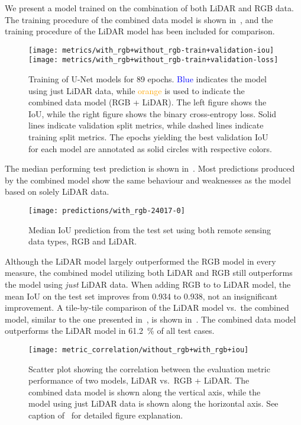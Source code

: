 We present a model trained on the combination of both LiDAR and RGB data.
The training procedure of the combined data model is shown in~, and the training procedure of the LiDAR model has been included for comparison.

\begin{figure}[H]
  \centering
  \texttt{[image: metrics/with\_rgb+without\_rgb-train+validation-iou]}
  \texttt{[image: metrics/with\_rgb+without\_rgb-train+validation-loss]}
  \caption{%
    Training of U-Net models for 89 epochs.
    \textcolor{blue}{Blue} indicates the model using just LiDAR data, while \textcolor{orange}{orange} is used to indicate the combined data model (RGB + LiDAR).
    The left figure shows the IoU, while the right figure shows the binary cross-entropy loss.
    Solid lines indicate validation split metrics, while dashed lines indicate training split metrics.
    The epochs yielding the best validation IoU for each model are annotated as solid circles with respective colors.
  }%
  \label{fig:rgb-lidar-training}
\end{figure}

The median performing test prediction is shown in~.
Most predictions produced by the combined model show the same behaviour and weaknesses as the model based on solely LiDAR data.

\begin{figure}[H]
  \centering
  \texttt{[image: predictions/with\_rgb-24017-0]}  %
  \caption{%
    Median IoU prediction from the test set using both remote sensing data types, RGB and LiDAR.
  }%
  \label{fig:rgb-lidar-median}
\end{figure}

Although the LiDAR model largely outperformed the RGB model in every measure, the combined model utilizing both LiDAR and RGB still outperforms the model using \emph{just} LiDAR data.
When adding RGB to to LiDAR model, the mean IoU on the test set improves from \num{0.934} to \num{0.938}, not an insignificant improvement.
A tile-by-tile comparison of the LiDAR model vs.\ the combined model, similar to the one presented in~, is shown in~.
The combined data model outperforms the LiDAR model in \SI{61.2}{\percent} of all test cases.

\begin{figure}[H]
  \centering
  \texttt{[image: metric\_correlation/without\_rgb+with\_rgb+iou]}
  \caption{%
    Scatter plot showing the correlation between the evaluation metric performance of two models, LiDAR vs.\ RGB + LiDAR\@.
    The combined data model is shown along the vertical axis, while the model using just LiDAR data is shown along the horizontal axis.
    See caption of~ for detailed figure explanation.
  }%
  \label{fig:lidar-combined-correlation}
\end{figure}

